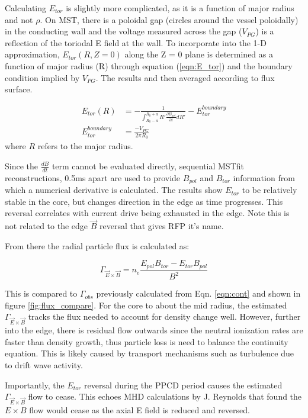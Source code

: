 \documentclass[aip, pop, preprint]{revtex4-1}
\begin{document}
Calculating $E_{tor}$ is slightly more complicated, as it is a function of major
radius and not $\rho$. On MST, there is a poloidal gap (circles around the vessel poloidally) in the conducting wall and the voltage measured across the gap ($V_{PG}$) is a reflection of the toriodal E field at the wall. To incorporate into the 1-D approximation, $E_{tor}(R, Z=0)$ along the
Z = 0 plane is determined as a function of major radius (R) through equation
(\ref{eqn:E_tor}) and the boundary condition implied by $V_{PG}$. The results and
then averaged according to flux surface. 

\begin{align}
E_{tor}(R) & = -\frac{1}{\int_{R_0 - a}^{R_0 + a} R' \frac{\partial B_{pol}}{\partial t} dR'} - E_{tor}^{boundary} \label{eqn:E_tor}\\
E_{tor}^{boundary} & = \frac{- V_{PG} }{2 \pi R_0}\label{eqn:E_tor_bc}
\end{align}
where $R$ refers to the major radius.

Since the $ \frac{dB}{dt} $ term cannot be evaluated directly, sequential
MSTfit reconstructions, 0.5ms apart are used to provide $ B_{pol} $ and $
B_{tor} $ information from which a numerical derivative is calculated. The results show $E_{tor}$ to
be relatively stable in the core, but changes direction in the edge as time
progresses. This reversal correlates with current drive being exhausted in the
edge. Note this is not related to the edge $\vec{B}$ reversal that gives RFP it's name.

From there the radial particle flux is calculated as:

\begin{equation}
\Gamma_{\vec{E} \times \vec{B}} = n_{e} \frac{E_{pol}B_{tor} - E_{tor}B_{pol}}{B^2}
\end{equation}

This is compared to $\Gamma_{obs}$ previously calculated from Eqn. \ref{eqn:cont} and shown in figure \ref{fig:flux_compare}. For the core to about the
mid radius, the estimated $\Gamma_{\vec{E} \times \vec{B}}$ tracks the flux
needed to account for density change well. However, further into the edge, there
is residual flow outwards since the neutral ionization rates are faster than
density growth, thus particle loss is need to balance the continuity equation.
This is likely caused by transport mechanisms such as turbulence due to
drift wave activity\cite{Duff2018ObservationPlasmas,Williams2017TurbulencePinch,NishizawaPRLSubmitted}.

Importantly, the $ E_{tor} $ reversal during the PPCD period causes the
estimated $ \Gamma_{\vec{E} \times \vec{B}} $ flow to cease. This echoes MHD
calculations by J. Reynolds that found the $ E \times B $ flow would cease as
the axial E field is reduced and reversed\cite{ReynoldsThesis}.
\end{document}
